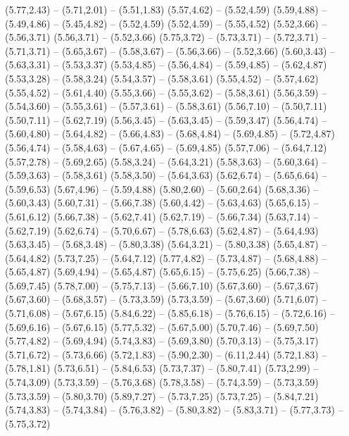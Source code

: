 {  (5.77,2.43) -- (5.71,2.01) -- (5.51,1.83)
  (5.57,4.62) -- (5.52,4.59)
  (5.59,4.88) -- (5.49,4.86) -- (5.45,4.82) -- (5.52,4.59)
  (5.52,4.59) -- (5.55,4.52)
  (5.52,3.66) -- (5.56,3.71)
  (5.56,3.71) -- (5.52,3.66)
  (5.75,3.72) -- (5.73,3.71) -- (5.72,3.71) -- (5.71,3.71) -- (5.65,3.67) -- (5.58,3.67) -- (5.56,3.66) -- (5.52,3.66)
  (5.60,3.43) -- (5.63,3.31) -- (5.53,3.37)
  (5.53,4.85) -- (5.56,4.84) -- (5.59,4.85) -- (5.62,4.87)
  (5.53,3.28) -- (5.58,3.24)
  (5.54,3.57) -- (5.58,3.61)
  (5.55,4.52) -- (5.57,4.62)
  (5.55,4.52) -- (5.61,4.40)
  (5.55,3.66) -- (5.55,3.62) -- (5.58,3.61)
  (5.56,3.59) -- (5.54,3.60) -- (5.55,3.61) -- (5.57,3.61) -- (5.58,3.61)
  (5.56,7.10) -- (5.50,7.11)
  (5.50,7.11) -- (5.62,7.19)
  (5.56,3.45) -- (5.63,3.45) -- (5.59,3.47)
  (5.56,4.74) -- (5.60,4.80) -- (5.64,4.82) -- (5.66,4.83) -- (5.68,4.84) -- (5.69,4.85) -- (5.72,4.87)
  (5.56,4.74) -- (5.58,4.63) -- (5.67,4.65) -- (5.69,4.85)
  (5.57,7.06) -- (5.64,7.12)
  (5.57,2.78) -- (5.69,2.65)
  (5.58,3.24) -- (5.64,3.21)
  (5.58,3.63) -- (5.60,3.64) -- (5.59,3.63) -- (5.58,3.61)
  (5.58,3.50) -- (5.64,3.63)
  (5.62,6.74) -- (5.65,6.64) -- (5.59,6.53)
  (5.67,4.96) -- (5.59,4.88)
  (5.80,2.60) -- (5.60,2.64)
  (5.68,3.36) -- (5.60,3.43)
  (5.60,7.31) -- (5.66,7.38)
  (5.60,4.42) -- (5.63,4.63)
  (5.65,6.15) -- (5.61,6.12)
  (5.66,7.38) -- (5.62,7.41)
  (5.62,7.19) -- (5.66,7.34)
  (5.63,7.14) -- (5.62,7.19)
  (5.62,6.74) -- (5.70,6.67) -- (5.78,6.63)
  (5.62,4.87) -- (5.64,4.93)
  (5.63,3.45) -- (5.68,3.48) -- (5.80,3.38)
  (5.64,3.21) -- (5.80,3.38)
  (5.65,4.87) -- (5.64,4.82)
  (5.73,7.25) -- (5.64,7.12)
  (5.77,4.82) -- (5.73,4.87) -- (5.68,4.88) -- (5.65,4.87)
  (5.69,4.94) -- (5.65,4.87)
  (5.65,6.15) -- (5.75,6.25)
  (5.66,7.38) -- (5.69,7.45)
  (5.78,7.00) -- (5.75,7.13) -- (5.66,7.10)
  (5.67,3.60) -- (5.67,3.67)
  (5.67,3.60) -- (5.68,3.57) -- (5.73,3.59)
  (5.73,3.59) -- (5.67,3.60)
  (5.71,6.07) -- (5.71,6.08) -- (5.67,6.15)
  (5.84,6.22) -- (5.85,6.18) -- (5.76,6.15) -- (5.72,6.16) -- (5.69,6.16) -- (5.67,6.15)
  (5.77,5.32) -- (5.67,5.00)
  (5.70,7.46) -- (5.69,7.50)
  (5.77,4.82) -- (5.69,4.94)
  (5.74,3.83) -- (5.69,3.80)
  (5.70,3.13) -- (5.75,3.17)
  (5.71,6.72) -- (5.73,6.66)
  (5.72,1.83) -- (5.90,2.30) -- (6.11,2.44)
  (5.72,1.83) -- (5.78,1.81)
  (5.73,6.51) -- (5.84,6.53)
  (5.73,7.37) -- (5.80,7.41)
  (5.73,2.99) -- (5.74,3.09)
  (5.73,3.59) -- (5.76,3.68)
  (5.78,3.58) -- (5.74,3.59) -- (5.73,3.59)
  (5.73,3.59) -- (5.80,3.70)
  (5.89,7.27) -- (5.73,7.25)
  (5.73,7.25) -- (5.84,7.21)
  (5.74,3.83) -- (5.74,3.84) -- (5.76,3.82) -- (5.80,3.82) -- (5.83,3.71) -- (5.77,3.73) -- (5.75,3.72)
}
